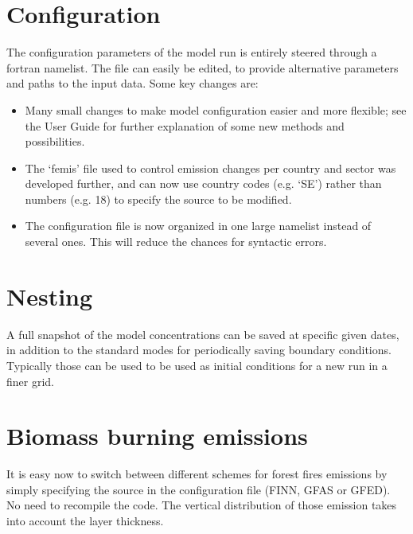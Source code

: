 \section{Configuration}
\label{sec:Config}

The configuration parameters of the model run is entirely steered through a fortran namelist.
The file can easily be edited, to provide alternative parameters and paths to the input data.
Some key changes are:

\begin{itemize}

\item
  Many small changes to make model configuration easier and more flexible; see the
  User Guide for further explanation of some new methods and possibilities. 

\item
  The `femis' file used to control emission changes per country and  sector was
developed further, and can now use country  codes (e.g. `SE') rather than 
numbers (e.g. 18) to specify the source to be modified.

\item
  The configuration file is now organized in one large namelist instead of several ones.
  This will reduce the chances for syntactic errors.

\end{itemize}

\section{Nesting}

A full snapshot of the model concentrations can be saved at specific given dates,
in addition to the standard modes for periodically saving boundary conditions.
Typically those can be used to be used as initial conditions for a new run in
a finer grid.

\section{Biomass burning emissions}

It is easy now to switch between different schemes for forest fires emissions
by simply specifying the source in the configuration file (FINN, GFAS or GFED).
No need to recompile the code.  The vertical distribution of those emission takes into account the layer thickness.

